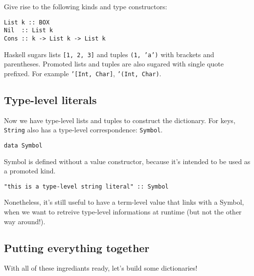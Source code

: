 \documentclass[pldi]{sigplanconf-pldi16}
\begin{document}
Give rise to the following kinds and type constructors:\footnotemark\footnotemark


\begin{verbatim}
List k :: BOX
Nil  :: List k
Cons :: k -> List k -> List k
\end{verbatim}

Haskell sugars lists \texttt{[1, 2, 3]} and
tuples \texttt{(1, 'a')} with brackets and parentheses.
Promoted lists and tuples are also sugared with single quote prefixed. For
example \texttt{'}\texttt{[Int, Char]},
\texttt{'}\texttt{(Int, Char)}.

\subsection{Type-level literals}

Now we have type-level lists and tuples to construct the dictionary.
For keys, \texttt{String} also has a type-level correspondence:
\texttt{Symbol}.

\begin{verbatim}
data Symbol
\end{verbatim}

Symbol is defined without a value constructor, because it's
intended to be used as a promoted kind.

\begin{verbatim}
"this is a type-level string literal" :: Symbol
\end{verbatim}

Nonetheless, it's still useful to have a term-level value that links with a
Symbol, when we want to retreive type-level informations at runtime (but not the
 other way around!).

\subsection{Putting everything together}

With all of these ingrediants ready, let's build some dictionaries!
\end{document}
